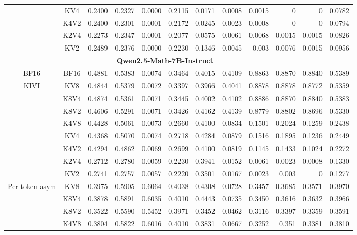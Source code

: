\begin{table}[ht]
{\begin{tabular}{ c c | r r r r r r r r r  | r }
& KV4 & 0.2400 & 0.2327 & 0.0000 & 0.2115 & 0.0171 & 0.0008 & 0.0015 & 0 & 0 & \colorbox{blue!30}{0.0782}\\
& K4V2 & 0.2400 & 0.2301 & 0.0001 & 0.2172 & 0.0245 & 0.0023 & 0.0008 & 0 & 0 & \colorbox{blue!30}{0.0794} \\
& K2V4 & 0.2273 & 0.2347 & 0.0001 & 0.2077 & 0.0575 & 0.0061 & 0.0068 & 0.0015 & 0.0015 & \colorbox{blue!30}{0.0826} \\
& KV2 & 0.2489 & 0.2376 & 0.0000 & 0.2230 & 0.1346 & 0.0045 & 0.003 & 0.0076 & 0.0015 & \colorbox{blue!30}{0.0956} \\\hline
\multicolumn{11}{c}{\textbf{Qwen2.5-Math-7B-Instruct}} \\ \hline
\multirow{1}{*}{BF16}
& BF16 & 0.4881 & 0.5383 & 0.0074 & 0.3464 & 0.4015 & 0.4109 & 0.8863 & 0.8870 & 0.8840 & 0.5389 \\\hline
\multirow{8}{*}{KIVI}
& KV8 & 0.4844 & 0.5379 & 0.0072 & 0.3397 & 0.3966 & 0.4041 & 0.8878 & 0.8878 & 0.8772 & 0.5359 \\
& K8V4 & 0.4874 & 0.5361 & 0.0071 & 0.3445 & 0.4002 & 0.4102 & 0.8886 & 0.8870 & 0.8840 & 0.5383 \\
& K8V2 & 0.4606 & 0.5291 & 0.0071 & 0.3426 & 0.4162 & 0.4139 & 0.8779 & 0.8802 & 0.8696 & 0.5330 \\
& K4V8 & 0.4428 & 0.5061 & 0.0073 & 0.2660 & 0.4100 & 0.0834 & 0.1501 & 0.2024 & 0.1259 & \colorbox{blue!30}{0.2438} \\
& KV4 & 0.4368 & 0.5070 & 0.0074 & 0.2718 & 0.4284 & 0.0879 & 0.1516 & 0.1895 & 0.1236 & \colorbox{blue!30}{0.2449} \\
& K4V2 & 0.4294 & 0.4862 & 0.0069 & 0.2699 & 0.4100 & 0.0819 & 0.1145 & 0.1433 & 0.1024 & \colorbox{blue!30}{0.2272} \\
& K2V4 & 0.2712 & 0.2780 & 0.0059 & 0.2230 & 0.3941 & 0.0152 & 0.0061 & 0.0023 & 0.0008 & \colorbox{blue!30}{0.1330} \\
& KV2 & 0.2741 & 0.2757 & 0.0057 & 0.2220 & 0.3501 & 0.0167 & 0.0023 & 0.003 & 0 & \colorbox{blue!30}{0.1277} \\\hline
\multirow{8}{*}{Per-token-asym}
& KV8 & 0.3975 & 0.5905 & 0.6064 & 0.4038 & 0.4308 & 0.0728 & 0.3457 & 0.3685 & 0.3571 & 0.3970 \\
& K8V4 & 0.3878 & 0.5891 & 0.6035 & 0.4010 & 0.4443 & 0.0735 & 0.3450 & 0.3616 & 0.3632 & 0.3966 \\
& K8V2 & 0.3522 & 0.5590 & 0.5452 & 0.3971 & 0.3452 & 0.0462 & 0.3116 & 0.3397 & 0.3359 & 0.3591 \\
& K4V8 & 0.3804 & 0.5822 & 0.6016 & 0.4010 & 0.3831 & 0.0667 & 0.3252 & 0.351 & 0.3381 & 0.3810 \\

\end{tabular}}
\end{table}
